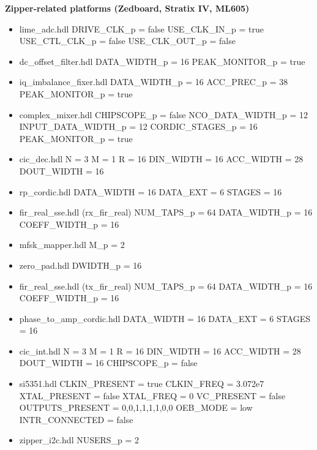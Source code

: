 \newpage
	\begin{minipage}[t]{.5\textwidth}
		\textbf{Zipper-related platforms (Zedboard, Stratix IV, ML605)}
	\begin{itemize}
		\item lime\_adc.hdl
			\subitem DRIVE\_CLK\_p = false
			\subitem USE\_CLK\_IN\_p = true
			\subitem USE\_CTL\_CLK\_p = false
			\subitem USE\_CLK\_OUT\_p = false
		\item dc\_offset\_filter.hdl
			\subitem DATA\_WIDTH\_p = 16
			\subitem PEAK\_MONITOR\_p = true
		\item iq\_imbalance\_fixer.hdl
			\subitem DATA\_WIDTH\_p = 16
			\subitem ACC\_PREC\_p = 38
			\subitem PEAK\_MONITOR\_p = true
		\item complex\_mixer.hdl
			\subitem CHIPSCOPE\_p = false
			\subitem NCO\_DATA\_WIDTH\_p = 12
			\subitem INPUT\_DATA\_WIDTH\_p = 12
			\subitem CORDIC\_STAGES\_p = 16
			\subitem PEAK\_MONITOR\_p = true
		\item cic\_dec.hdl
			\subitem N = 3
			\subitem M = 1
			\subitem R = 16
			\subitem DIN\_WIDTH = 16
			\subitem ACC\_WIDTH = 28
			\subitem DOUT\_WIDTH = 16
		\item rp\_cordic.hdl
			\subitem DATA\_WIDTH = 16
			\subitem DATA\_EXT = 6
			\subitem STAGES = 16
		\item fir\_real\_sse.hdl (rx\_fir\_real)
			\subitem NUM\_TAPS\_p = 64
			\subitem DATA\_WIDTH\_p = 16
			\subitem COEFF\_WIDTH\_p = 16
		\item mfsk\_mapper.hdl
			\subitem M\_p = 2
		\item zero\_pad.hdl
			\subitem DWIDTH\_p = 16
	\end{itemize}
	\end{minipage}
	\begin{minipage}[t]{.5\textwidth}
		\textbf{ }
	\begin{itemize}
		\item fir\_real\_sse.hdl (tx\_fir\_real)
			\subitem NUM\_TAPS\_p = 64
			\subitem DATA\_WIDTH\_p = 16
			\subitem COEFF\_WIDTH\_p = 16
		\item phase\_to\_amp\_cordic.hdl
			\subitem DATA\_WIDTH = 16
			\subitem DATA\_EXT = 6
			\subitem STAGES = 16
		\item cic\_int.hdl
			\subitem N = 3
			\subitem M = 1
			\subitem R = 16
			\subitem DIN\_WIDTH = 16
			\subitem ACC\_WIDTH = 28
			\subitem DOUT\_WIDTH = 16
			\subitem CHIPSCOPE\_p = false
		\item si5351.hdl
			\subitem CLKIN\_PRESENT = true
			\subitem CLKIN\_FREQ = 3.072e7
			\subitem XTAL\_PRESENT = false
			\subitem XTAL\_FREQ = 0
			\subitem VC\_PRESENT = false
			\subitem OUTPUTS\_PRESENT = 0,0,1,1,1,1,0,0
			\subitem OEB\_MODE = low
			\subitem INTR\_CONNECTED = false
		\item zipper\_i2c.hdl
			\subitem NUSERS\_p = 2
	\end{itemize}
	\end{minipage}
	\pagebreak
